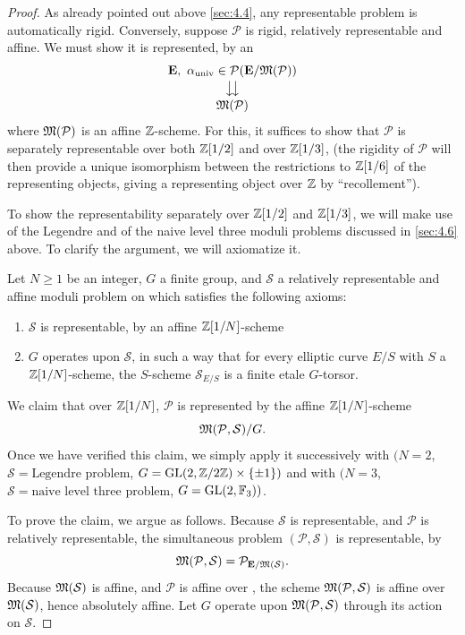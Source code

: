 \begin{proof}
As already pointed out above \ref{sec:4.4}, any representable problem is automatically rigid. Conversely, suppose $\mathcal{P}$ is rigid, relatively representable and affine. We must show it is represented, by an
\[
\begin{array}{@{}c@{}}
\mathbf{E},\ \alpha_{\mathrm{univ}} \in \mathcal{P}(\mathbf{E}/\Mfrak(\mathcal{P})) \\[2pt]
\big\downarrow\!\big\downarrow \\[2pt]
\Mfrak(\mathcal{P})
\end{array}
\]
where $\mathfrak{M}(\mathcal{P})$ is an affine $\mathbb{Z}$-scheme. For this, it suffices to show that $\mathcal{P}$ is separately representable over both $\mathbb{Z}[1/2]$ and over $\mathbb{Z}[1/3]$, (the rigidity of $\mathcal{P}$ will then provide a unique isomorphism between the restrictions to $\mathbb{Z}[1/6]$ of the representing objects, giving a representing object over $\mathbb{Z}$ by ``recollement'').

To show the representability separately over $\mathbb{Z}[1/2]$ and $\mathbb{Z}[1/3]$, we will make use of the Legendre and of the naive level three moduli problems discussed in \ref{sec:4.6} above. To clarify the argument, we will axiomatize it.

Let $N \ge 1$ be an integer, $G$ a finite group, and $\mathcal{S}$ a relatively representable and affine moduli problem on \Ell which satisfies the following axioms:
\begin{enumerate}[1)]
\item $\mathcal{S}$ is representable, by an affine $\mathbb{Z}[1/N]$-scheme
\item $G$ operates upon $\mathcal{S}$, in such a way that for every elliptic curve $E/S$ with $S$ a $\mathbb{Z}[1/N]$-scheme, the $S$-scheme $\mathcal{S}_{E/S}$ is a finite etale $G$-torsor.
\end{enumerate}
We claim that over $\mathbb{Z}[1/N]$, $\mathcal{P}$ is represented by the affine $\mathbb{Z}[1/N]$-scheme
\[
\mathfrak{M}(\mathcal{P}, \mathcal{S})/G.
\]
Once we have verified this claim, we simply apply it successively with $(N = 2$, $\mathcal{S} = \text{Legendre problem}$, $G = \operatorname{GL}(2, \mathbb{Z}/2\mathbb{Z}) \times \{\pm 1\})$ and with $(N = 3$, $\mathcal{S} = \text{naive level three problem}$, $G = \operatorname{GL}(2, \mathbb{F}_3))$.

To prove the claim, we argue as follows. Because $\mathcal{S}$ is representable, and $\mathcal{P}$ is relatively representable, the simultaneous problem $(\mathcal{P}, \mathcal{S})$ is representable, by
\[
\mathfrak{M}(\mathcal{P}, \mathcal{S}) = \mathcal{P}_{\mathbf{E}/\mathfrak{M}(\mathcal{S})}.
\]
Because $\mathfrak{M}(\mathcal{S})$ is affine, and $\mathcal{P}$ is affine over \Ell, the scheme $\mathfrak{M}(\mathcal{P}, \mathcal{S})$ is affine over $\mathfrak{M}(\mathcal{S})$, hence absolutely affine. Let $G$ operate upon $\mathfrak{M}(\mathcal{P}, \mathcal{S})$ through its action on $\mathcal{S}$.


\end{proof}
